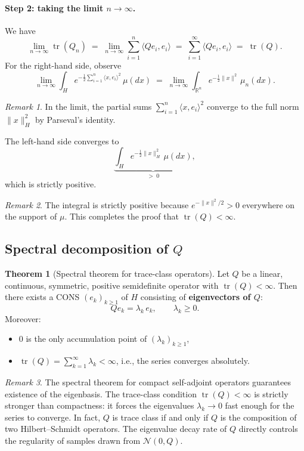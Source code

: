 \documentclass[11pt]{article}
\theoremstyle{definition}
\newtheorem{theorem}{Theorem}
\theoremstyle{remark}
\newtheorem{remark}{Remark}
\DeclareMathOperator{\tr}{tr}
\begin{document}
\paragraph{Step 2: taking the limit $n \to \infty$.}
We have
\[
    \lim_{n \to \infty} \tr(Q_n)
    \;=\; \lim_{n \to \infty} \sum_{i=1}^{n} \langle Q e_i, e_i \rangle
    \;=\; \sum_{i=1}^{\infty} \langle Q e_i, e_i \rangle
    \;=\; \tr(Q).
\]
For the right-hand side, observe
\[
    \lim_{n \to \infty}
    \int_H e^{-\frac{1}{2}\sum_{i=1}^{n} \langle x, e_i \rangle^2}\,\mu(dx)
    \;=\;
    \lim_{n \to \infty}
    \int_{\mathbb{R}^n} e^{-\frac{1}{2}\|x\|^2}\,\mu_n(dx).
\]
\begin{remark}
In the limit, the partial sums $\sum_{i=1}^{n} \langle x, e_i \rangle^2$ converge to the full norm $\|x\|_H^2$ by Parseval's identity.
\end{remark}
The left-hand side converges to
\[
    \underbrace{
    \int_H e^{-\frac{1}{2}\|x\|_H^2}\,\mu(dx)
    }_{> \; 0},
\]
which is strictly positive.
\begin{remark}
The integral is strictly positive because $e^{-\|x\|^2/2} > 0$ everywhere on the support of $\mu$. This completes the proof that $\tr(Q) < \infty$.
\end{remark}

\subsection*{Spectral decomposition of $Q$}

\begin{theorem}[Spectral theorem for trace-class operators]
Let $Q$ be a linear, continuous, symmetric, positive semidefinite operator
with $\tr(Q) < \infty$.  Then there exists a CONS $(e_k)_{k \ge 1}$ of $H$
consisting of \textbf{eigenvectors of $Q$}:
\[
    Q e_k = \lambda_k\, e_k, \qquad \lambda_k \ge 0.
\]
Moreover:
\begin{itemize}
    \item $0$ is the only accumulation point of $(\lambda_k)_{k \ge 1}$,
    \item $\tr(Q) = \displaystyle\sum_{k=1}^{\infty} \lambda_k < \infty$,
          \quad i.e., the series converges absolutely.
\end{itemize}
\end{theorem}

\begin{remark}
The spectral theorem for compact self-adjoint operators guarantees existence of the eigenbasis.  The trace-class condition $\tr(Q) < \infty$ is strictly stronger than compactness: it forces the eigenvalues $\lambda_k \to 0$ fast enough for the series to converge.  In fact, $Q$ is trace class if and only if $Q$ is the composition of two Hilbert--Schmidt operators.  The eigenvalue decay rate of $Q$ directly controls the regularity of samples drawn from $\mathcal{N}(0,Q)$.
\end{remark}
\end{document}
